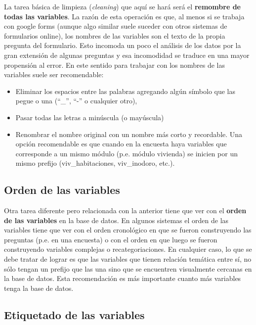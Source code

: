 \documentclass[
  letterpaper,
  DIV=11,
  numbers=noendperiod]{scrreprt}
\begin{document}
La tarea básica de limpieza (\emph{cleaning}) que aquí se hará será el
\textbf{remombre de todas las variables}. La razón de esta operación es
que, al menos si se trabaja con google forms (aunque algo similar suele
suceder con otros sistemas de formularios online), los nombres de las
variables son el texto de la propia pregunta del formulario. Esto
incomoda un poco el análisis de los datos por la gran extensión de
algunas preguntas y esa incomodidad se traduce en una mayor propensión
al error. En este sentido para trabajar con los nombres de las variables
suele ser recomendable:

\begin{itemize}
\item
  Eliminar los espacios entre las palabras agregando algún símbolo que
  las pegue o una (``\_'', ``-'' o cualquier otro),
\item
  Pasar todas las letras a minúscula (o mayúscula)
\item
  Renombrar el nombre original con un nombre más corto y recordable. Una
  opción recomendable es que cuando en la encuesta haya variables que
  corresponde a un mismo módulo (p.e. módulo vivienda) se inicien por un
  mismo prefijo (viv\_habitaciones, viv\_inodoro, etc.).
\end{itemize}

\hypertarget{orden-de-las-variables}{%
\subsection{Orden de las variables}\label{orden-de-las-variables}}

Otra tarea diferente pero relacionada con la anterior tiene que ver con
el \textbf{orden de las variables} en la base de datos. En algunos
sistemas el orden de las variables tiene que ver con el orden
cronológico en que se fueron construyendo las preguntas (p.e. en una
encuesta) o con el orden en que luego se fueron construyendo variables
complejas o recategoriaciones. En cualquier caso, lo que se debe tratar
de lograr es que las variables que tienen relación temática entre sí, no
sólo tengan un prefijo que las una sino que se encuentren visualmente
cercanas en la base de datos. Esta recomendación es más importante
cuanto más variables tenga la base de datos.

\hypertarget{etiquetado-de-las-variables}{%
\subsection{Etiquetado de las
variables}\label{etiquetado-de-las-variables}}
\end{document}
